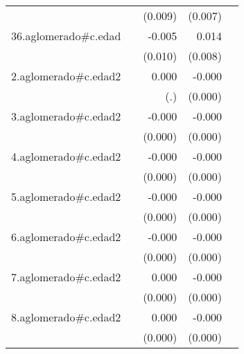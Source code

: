 {\begin{longtable}{l*{4}{D{.}{.}{-1}}}
            &                     &     (0.009)         &     (0.007)         &                     \\
\addlinespace
36.aglomerado#c.edad&                     &      -0.005         &       0.014         &                     \\
            &                     &     (0.010)         &     (0.008)         &                     \\
\addlinespace
2.aglomerado#c.edad2&                     &       0.000         &      -0.000\sym{*}  &                     \\
            &                     &         (.)         &     (0.000)         &                     \\
\addlinespace
3.aglomerado#c.edad2&                     &      -0.000         &      -0.000\sym{***}&                     \\
            &                     &     (0.000)         &     (0.000)         &                     \\
\addlinespace
4.aglomerado#c.edad2&                     &      -0.000         &      -0.000\sym{**} &                     \\
            &                     &     (0.000)         &     (0.000)         &                     \\
\addlinespace
5.aglomerado#c.edad2&                     &      -0.000         &      -0.000\sym{*}  &                     \\
            &                     &     (0.000)         &     (0.000)         &                     \\
\addlinespace
6.aglomerado#c.edad2&                     &      -0.000         &      -0.000\sym{***}&                     \\
            &                     &     (0.000)         &     (0.000)         &                     \\
\addlinespace
7.aglomerado#c.edad2&                     &       0.000         &      -0.000         &                     \\
            &                     &     (0.000)         &     (0.000)         &                     \\
\addlinespace
8.aglomerado#c.edad2&                     &       0.000         &      -0.000         &                     \\
            &                     &     (0.000)         &     (0.000)         &                     \\

\end{longtable}}
